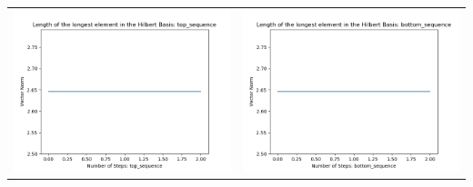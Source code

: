 \documentclass[10pt]{article}
\begin{document}
\begin{tabular}{c|c}
\begin{minipage}{.4\textwidth}
\includegraphics[width=\textwidth]{"DATA/5d/5 generators 1 bound F/top_sequence LENGTH"}
\end{minipage} &
\begin{minipage}{.4\textwidth}
\includegraphics[width=\textwidth]{"DATA/5d/5 generators 1 bound F bottomup/bottom_sequence LENGTH"}
\end{minipage}
\end{tabular}
\end{document}
